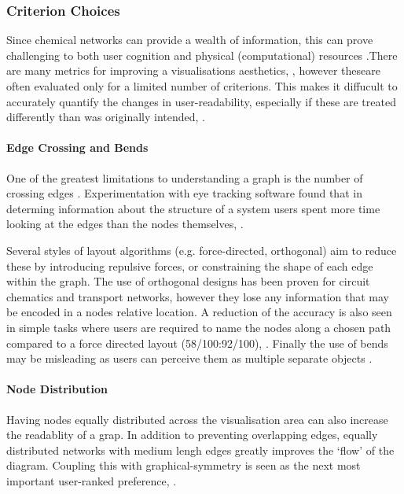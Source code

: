 \subsubsection{Criterion Choices}
Since chemical networks can provide a wealth of information, this can prove challenging to both user cognition and  physical (computational) resources \cite{ch1}.There are many metrics for improving a visualisations aesthetics, \cite{metricgraphaesthetics}, however theseare often evaluated only for a limited number of criterions. This makes it diffucult to accurately quantify the changes in user-readability, especially if these are treated differently than was originally intended, \cite{eyetrack}. 


\paragraph*{Edge Crossing and Bends} \label{edgecross}
One of the greatest limitations to understanding a graph is the number of crossing edges \cite{humanaesthetic}. Experimentation with eye tracking software found that in determing information about the structure of a system users spent more time looking at the edges than the nodes themselves, \cite{eyetrack}. 

Several styles of layout algorithms (e.g. force-directed, orthogonal) aim to reduce these by introducing repulsive forces, or constraining the shape of each edge within the graph. The use of orthogonal designs has been proven for circuit chematics and transport networks, however they lose any information that may be encoded in a nodes relative location. A reduction of the accuracy is also seen in simple tasks where users are required to name the nodes along a chosen path compared to a force directed layout (58/100:92/100), \cite{eyetrack}. Finally the use of bends may be misleading as users can perceive them as multiple separate objects \cite{aestheticsgraphvis}.
    
 
\paragraph*{Node Distribution}
Having nodes equally distributed across the visualisation area can also increase the readablity of a grap. In addition to preventing overlapping edges, equally distributed networks with medium lengh edges greatly improves the `flow' of the diagram. Coupling this with graphical-symmetry is seen as the next most important user-ranked preference, \cite{ch6graphredability}. 


